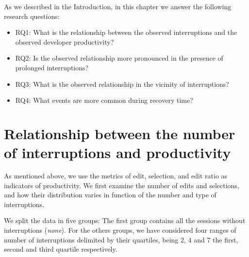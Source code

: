 As we described in the Introduction, in this chapter we answer the following research questions:
\begin{itemize}
	\item RQ1: What is the relationship between the observed interruptions and the observed developer productivity?
	\item RQ2: Is the observed relationship more pronounced in the presence of prolonged interruptions?
	\item RQ3: What is the observed relationship in the vicinity of interruptions?
	\item RQ4: What events are more common during recovery time?
\end{itemize}



\section{Relationship between the number of interruptions and productivity}
As mentioned above, we use the metrics of edit, selection, and edit ratio as indicators of productivity. We first examine the number of edits and selections, and how their distribution varies in function of the number and type of interruptions.

We split the data in five groups: The first group contains all the sessions without interruptions (\textit{none}). For the others groups, we have considered four ranges of number of interruptions delimited by their quartiles, being 2, 4 and 7 the first, second and third quartile respectively.


